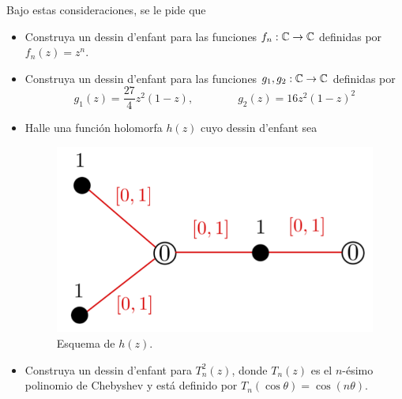 \begin{exercise}
\begin{itemize}
    Bajo estas consideraciones, se le pide que
    \begin{itemize}
        \item Construya un dessin d'enfant para las funciones $f_n : \mathbb C \to \mathbb C$ definidas por $f_n(z) = z^n$.
        \item Construya un dessin d'enfant para las funciones $g_1, g_2 : \mathbb C \to \mathbb C$ definidas por
        $$g_1(z) = \frac {27} 4 z^2 (1-z), \qquad \qquad g_2(z) = 16 z^2 (1 - z)^2$$
        
        \item Halle una función holomorfa $h(z)$ cuyo dessin d'enfant sea
        \begin{figure}[h]
            \centering
            \includegraphics[scale=0.25]{dessins/example.png}
            \caption{Esquema de $h(z)$.}
        \end{figure}
        
        \item Construya un dessin d'enfant para $T_n^2(z)$, donde $T_n(z)$ es el $n$-ésimo polinomio de Chebyshev y está definido por $T_n(\cos \theta) = \cos(n\theta)$.
    \end{itemize}
\end{itemize}
\end{exercise}

